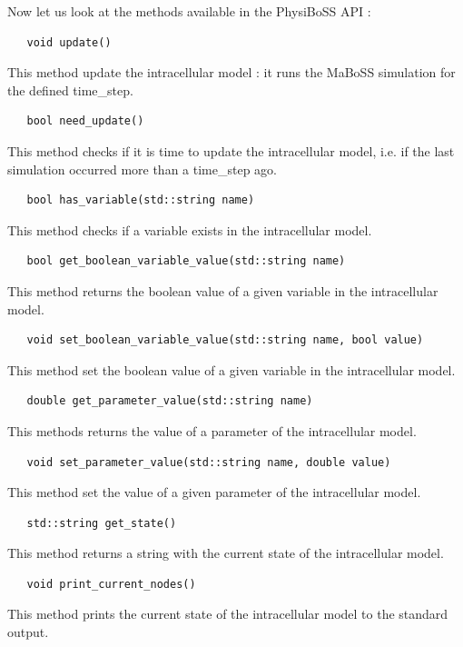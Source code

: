 \documentclass[12pt]{article}
\begin{document}
Now let us look at the methods available in the PhysiBoSS API : 

\begin{verbatim}
   void update()
\end{verbatim}
This method update the intracellular model : it runs the MaBoSS simulation for the defined time\_step. 

\begin{verbatim}
   bool need_update()
\end{verbatim}
This method checks if it is time to update the intracellular model, i.e. if the last simulation occurred more than a time\_step ago. 

\begin{verbatim}	
   bool has_variable(std::string name)
\end{verbatim}
This method checks if a variable exists in the intracellular model.

\begin{verbatim}	
   bool get_boolean_variable_value(std::string name)
\end{verbatim}
This method returns the boolean value of a given variable in the intracellular model.

\begin{verbatim}	
   void set_boolean_variable_value(std::string name, bool value)
\end{verbatim}
This method set the boolean value of a given variable in the intracellular model.

\begin{verbatim}
   double get_parameter_value(std::string name)
\end{verbatim}
This methods returns the value of a parameter of the intracellular model.

\begin{verbatim}	
   void set_parameter_value(std::string name, double value)
\end{verbatim}
This method set the value of a given parameter of the intracellular model.

\begin{verbatim}	
   std::string get_state()
\end{verbatim}
This method returns a string with the current state of the intracellular model.

\begin{verbatim}	
   void print_current_nodes()
\end{verbatim}
This method prints the current state of the intracellular model to the standard output.
\end{document}
